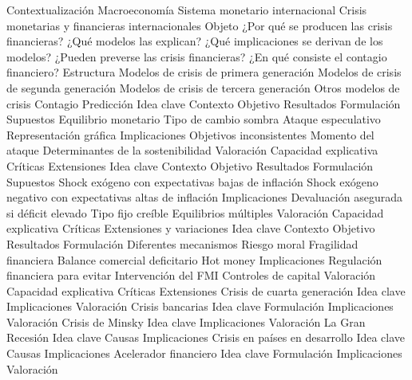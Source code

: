 \documentclass{nuevotema}
\begin{document}
\begin{esquema}[enumerate]
	\1[] 
		\2 Contextualización
			\3 Macroeconomía
			\3 Sistema monetario internacional
			\3 Crisis monetarias y financieras internacionales
		\2 Objeto
			\3 ¿Por qué se producen las crisis financieras?
			\3 ¿Qué modelos las explican?
			\3 ¿Qué implicaciones se derivan de los modelos?
			\3 ¿Pueden preverse las crisis financieras?
			\3 ¿En qué consiste el contagio financiero?
		\2 Estructura
			\3 Modelos de crisis de primera generación
			\3 Modelos de crisis de segunda generación
			\3 Modelos de crisis de tercera generación
			\3 Otros modelos de crisis
			\3 Contagio
			\3 Predicción
	\1 
		\2 Idea clave
			\3 Contexto
			\3 Objetivo
			\3 Resultados
		\2 Formulación
			\3 Supuestos
			\3 Equilibrio monetario
			\3 Tipo de cambio sombra
			\3 Ataque especulativo
			\3 Representación gráfica
		\2 Implicaciones
			\3 Objetivos inconsistentes
			\3 Momento del ataque
			\3 Determinantes de la sostenibilidad
		\2 Valoración
			\3 Capacidad explicativa
			\3 Críticas
			\3 Extensiones
	\1 
		\2 Idea clave
			\3 Contexto
			\3 Objetivo
			\3 Resultados
		\2 Formulación
			\3 Supuestos
			\3 Shock exógeno con expectativas bajas de inflación
			\3 Shock exógeno negativo con expectativas altas de inflación
		\2 Implicaciones
			\3 Devaluación asegurada si déficit elevado
			\3 Tipo fijo creíble
			\3 Equilibrios múltiples
		\2 Valoración
			\3 Capacidad explicativa
			\3 Críticas
			\3 Extensiones y variaciones
	\1 
		\2 Idea clave
			\3 Contexto
			\3 Objetivo
			\3 Resultados
		\2 Formulación
			\3 Diferentes mecanismos
			\3 Riesgo moral
			\3 Fragilidad financiera
			\3 Balance comercial deficitario
			\3 Hot money
		\2 Implicaciones
			\3 Regulación financiera para evitar
			\3 Intervención del FMI
			\3 Controles de capital
		\2 Valoración
			\3 Capacidad explicativa
			\3 Críticas
			\3 Extensiones
	\1 
		\2 Crisis de cuarta generación
			\3 Idea clave
			\3 Implicaciones
			\3 Valoración
		\2 Crisis bancarias
			\3 Idea clave
			\3 Formulación
			\3 Implicaciones
			\3 Valoración
		\2 Crisis de Minsky
			\3 Idea clave
			\3 Implicaciones
			\3 Valoración
		\2 La Gran Recesión
			\3 Idea clave
			\3 Causas
			\3 Implicaciones
		\2 Crisis en países en desarrollo
			\3 Idea clave
			\3 Causas
			\3 Implicaciones
		\2 Acelerador financiero
			\3 Idea clave
			\3 Formulación
			\3 Implicaciones
			\3 Valoración
	\1 

\end{esquema}
\end{document}
